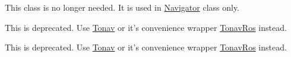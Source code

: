 
\begin{DoxyRefList}
\item[\label{deprecated__deprecated000002}%
\hypertarget{deprecated__deprecated000002}{}%
Class \hyperlink{class_imu_buffer}{Imu\-Buffer} ]This class is no longer needed. It is used in \hyperlink{class_navigator}{Navigator} class only. 
\item[\label{deprecated__deprecated000003}%
\hypertarget{deprecated__deprecated000003}{}%
Class \hyperlink{class_navigator}{Navigator} ]This is deprecated. Use \hyperlink{class_tonav}{Tonav} or it's convenience wrapper \hyperlink{class_tonav_ros}{Tonav\-Ros} instead.  
\item[\label{deprecated__deprecated000004}%
\hypertarget{deprecated__deprecated000004}{}%
Member \hyperlink{class_navigator_a614e53f6cf6859608b14057272003cea}{Navigator\-:\-:run} (int argc, const char $\ast$argv\mbox{[}\mbox{]})]This is deprecated. Use \hyperlink{class_tonav}{Tonav} or it's convenience wrapper \hyperlink{class_tonav_ros}{Tonav\-Ros} instead.
\end{DoxyRefList}